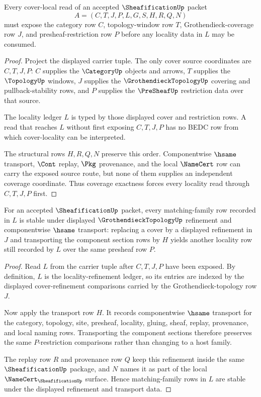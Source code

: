 \begin{theorem}
\label{thm:sheafification-coverage-exactness}
Every cover-local read of an accepted $\SheafificationUp$ packet
$$
A=(C,T,J,P,L,G,S,H,R,Q,N)
$$
must expose the category row $C$, topology-window row $T$, Grothendieck-coverage row $J$, and presheaf-restriction row $P$ before any locality data in $L$ may be consumed.
\end{theorem}
\begin{proof}
Project the displayed carrier tuple. The only cover source coordinates are $C,T,J,P$: $C$ supplies the $\CategoryUp$ objects and arrows, $T$ supplies the $\TopologyUp$ windows, $J$ supplies the $\GrothendieckTopologyUp$ covering and pullback-stability rows, and $P$ supplies the $\PreSheafUp$ restriction data over that source.

The locality ledger $L$ is typed by those displayed cover and restriction rows. A read that reaches $L$ without first exposing $C,T,J,P$ has no BEDC row from which cover-locality can be interpreted.

The structural rows $H,R,Q,N$ preserve this order. Componentwise $\hsame$ transport, $\Cont$ replay, $\Pkg$ provenance, and the local $\NameCert$ row can carry the exposed source route, but none of them supplies an independent coverage coordinate. Thus coverage exactness forces every locality read through $C,T,J,P$ first.
\end{proof}

\begin{theorem}
\label{thm:sheafification-locality-refinement}
For an accepted $\SheafificationUp$ packet, every matching-family row recorded in $L$ is stable under displayed $\GrothendieckTopologyUp$ refinement and componentwise $\hsame$ transport: replacing a cover by a displayed refinement in $J$ and transporting the component section rows by $H$ yields another locality row still recorded by $L$ over the same presheaf row $P$.
\end{theorem}
\begin{proof}
Read $L$ from the carrier tuple after $C,T,J,P$ have been exposed. By definition, $L$ is the locality-refinement ledger, so its entries are indexed by the displayed cover-refinement comparisons carried by the Grothendieck-topology row $J$.

Now apply the transport row $H$. It records componentwise $\hsame$ transport for the category, topology, site, presheaf, locality, gluing, sheaf, replay, provenance, and local naming rows. Transporting the component sections therefore preserves the same $P$-restriction comparisons rather than changing to a host family.

The replay row $R$ and provenance row $Q$ keep this refinement inside the same $\SheafificationUp$ package, and $N$ names it as part of the local $\NameCert_{\SheafificationUp}$ surface. Hence matching-family rows in $L$ are stable under the displayed refinement and transport data.
\end{proof}

